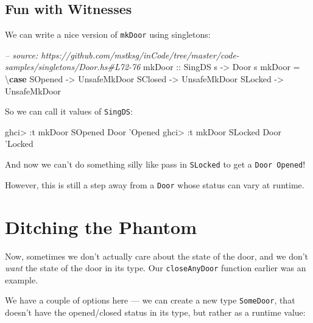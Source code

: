 \documentclass[]{article}
\newenvironment{Shaded}{}{}
\newcommand{\KeywordTok}[1]{\textcolor[rgb]{0.00,0.44,0.13}{\textbf{#1}}}
\newcommand{\DataTypeTok}[1]{\textcolor[rgb]{0.56,0.13,0.00}{#1}}
\newcommand{\CharTok}[1]{\textcolor[rgb]{0.25,0.44,0.63}{#1}}
\newcommand{\CommentTok}[1]{\textcolor[rgb]{0.38,0.63,0.69}{\textit{#1}}}
\newcommand{\OtherTok}[1]{\textcolor[rgb]{0.00,0.44,0.13}{#1}}
\newcommand{\FunctionTok}[1]{\textcolor[rgb]{0.02,0.16,0.49}{#1}}
\newcommand{\NormalTok}[1]{#1}
\begin{document}
\subsection{Fun with Witnesses}\label{fun-with-witnesses}

We can write a nice version of \texttt{mkDoor} using singletons:

\begin{Shaded}
\begin{Highlighting}[]
\CommentTok{-- source: https://github.com/mstksg/inCode/tree/master/code-samples/singletons/Door.hs#L72-76}
\OtherTok{mkDoor ::} \DataTypeTok{SingDS}\NormalTok{ s }\OtherTok{->} \DataTypeTok{Door}\NormalTok{ s}
\NormalTok{mkDoor }\FunctionTok{=}\NormalTok{ \textbackslash{}}\KeywordTok{case}
    \DataTypeTok{SOpened} \OtherTok{->} \DataTypeTok{UnsafeMkDoor}
    \DataTypeTok{SClosed} \OtherTok{->} \DataTypeTok{UnsafeMkDoor}
    \DataTypeTok{SLocked} \OtherTok{->} \DataTypeTok{UnsafeMkDoor}
\end{Highlighting}
\end{Shaded}

So we can call it values of \texttt{SingDS}:

\begin{Shaded}
\begin{Highlighting}[]
\NormalTok{ghci}\FunctionTok{>} \FunctionTok{:}\NormalTok{t mkDoor }\DataTypeTok{SOpened}
\DataTypeTok{Door} \CharTok{'Opened}
\NormalTok{ghci}\FunctionTok{>} \FunctionTok{:}\NormalTok{t mkDoor }\DataTypeTok{SLocked}
\DataTypeTok{Door} \CharTok{'Locked}
\end{Highlighting}
\end{Shaded}

And now we can't do something silly like pass in \texttt{SLocked} to get a
\texttt{Door\ \textquotesingle{}Opened}!

However, this is still a step away from a \texttt{Door} whose status can vary at
runtime.

\section{Ditching the Phantom}\label{ditching-the-phantom}

Now, sometimes we don't actually care about the state of the door, and we don't
\emph{want} the state of the door in its type. Our \texttt{closeAnyDoor}
function earlier was an example.

We have a couple of options here --- we can create a new type \texttt{SomeDoor},
that doesn't have the opened/closed status in its type, but rather as a runtime
value:
\end{document}

